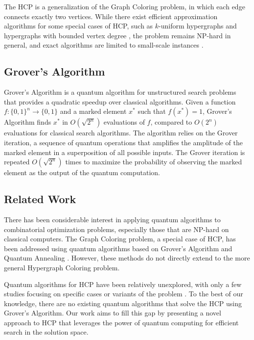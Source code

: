 The HCP is a generalization of the Graph Coloring problem, in which each edge connects exactly two vertices. While there exist efficient approximation algorithms for some special cases of HCP, such as $k$-uniform hypergraphs and hypergraphs with bounded vertex degree \cite{alon1994coloring, karger1994new}, the problem remains NP-hard in general, and exact algorithms are limited to small-scale instances \cite{garey1979computers}.

\subsection{Grover's Algorithm}

Grover's Algorithm \cite{grover1996fast} is a quantum algorithm for unstructured search problems that provides a quadratic speedup over classical algorithms. Given a function $f : \{0, 1\}^n \rightarrow \{0, 1\}$ and a marked element $x^*$ such that $f(x^*) = 1$, Grover's Algorithm finds $x^*$ in $O(\sqrt{2^n})$ evaluations of $f$, compared to $O(2^n)$ evaluations for classical search algorithms. The algorithm relies on the Grover iteration, a sequence of quantum operations that amplifies the amplitude of the marked element in a superposition of all possible inputs. The Grover iteration is repeated $O(\sqrt{2^n})$ times to maximize the probability of observing the marked element as the output of the quantum computation.

\subsection{Related Work}

There has been considerable interest in applying quantum algorithms to combinatorial optimization problems, especially those that are NP-hard on classical computers. The Graph Coloring problem, a special case of HCP, has been addressed using quantum algorithms based on Grover's Algorithm \cite{childs2000quantum} and Quantum Annealing \cite{zhou2018quantum}. However, these methods do not directly extend to the more general Hypergraph Coloring problem.

Quantum algorithms for HCP have been relatively unexplored, with only a few studies focusing on specific cases or variants of the problem \cite{ambainis2005quantum, li2018quantum}. To the best of our knowledge, there are no existing quantum algorithms that solve the HCP using Grover's Algorithm. Our work aims to fill this gap by presenting a novel approach to HCP that leverages the power of quantum computing for efficient search in the solution space.

